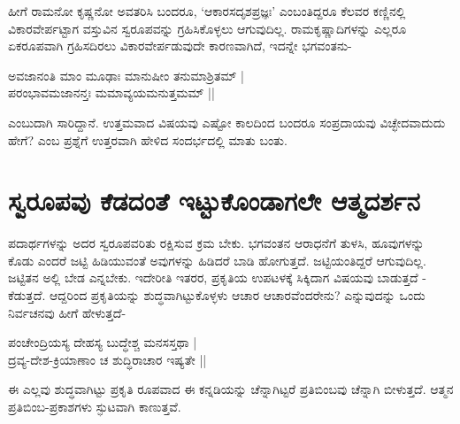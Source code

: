 ಹೀಗೆ ರಾಮನೋ ಕೃಷ್ಣನೋ ಅವತರಿಸಿ ಬಂದರೂ, `ಆಕಾರಸದೃಶಪ್ರಜ್ಞಃ' ಎಂಬಂತಿದ್ದರೂ ಕೆಲವರ ಕಣ್ಣಿನಲ್ಲಿ ವಿಕಾರವೇರ್ಪಟ್ಟಾಗ ವಸ್ತುವಿನ ಸ್ವರೂಪವನ್ನು ಗ್ರಹಿಸಿಕೊಳ್ಳಲು ಆಗುವುದಿಲ್ಲ. ರಾಮಕೃಷ್ಣಾದಿಗಳನ್ನು ಎಲ್ಲರೂ ಏಕರೂಪವಾಗಿ ಗ್ರಹಿಸದಿರಲು ವಿಕಾರವೇರ್ಪಡುವುದೇ ಕಾರಣವಾಗಿದೆ, ಇದನ್ನೇ ಭಗವಂತನು-

\begin{shloka}
ಅವಜಾನಂತಿ ಮಾಂ ಮೂಢಾಃ ಮಾನುಷೀಂ ತನುಮಾಶ್ರಿತಮ್ |\\
ಪರಂಭಾವಮಜಾನನ್ತಃ ಮಮಾವ್ಯಯಮನುತ್ತಮಮ್ ||
\end{shloka}

ಎಂಬುದಾಗಿ ಸಾರಿದ್ದಾನೆ. ಉತ್ತಮವಾದ ವಿಷಯವು ಎಷ್ಟೋ ಕಾಲದಿಂದ ಬಂದರೂ ಸಂಪ್ರದಾಯವು ವಿಚ್ಛೇದವಾದುದು ಹೇಗೆ? ಎಂಬ ಪ್ರಶ್ನೆಗೆ ಉತ್ತರವಾಗಿ ಹೇಳಿದ ಸಂದರ್ಭದಲ್ಲಿ ಮಾತು ಬಂತು.

\section*{ಸ್ವರೂಪವು ಕೆಡದಂತೆ ಇಟ್ಟುಕೊಂಡಾಗಲೇ ಆತ್ಮದರ್ಶನ}

ಪದಾರ್ಥಗಳನ್ನು ಅದರ ಸ್ವರೂಪವರಿತು ರಕ್ಷಿಸುವ ಕ್ರಮ ಬೇಕು. ಭಗವಂತನ ಆರಾಧನೆಗೆ ತುಳಸಿ, ಹೂವುಗಳನ್ನು ಕೊಡು ಎಂದರೆ ಜಟ್ಟಿ ಹಿಡಿಯುವಂತೆ ಅವುಗಳನ್ನು ಹಿಡಿದರೆ ಬಾಡಿ ಹೋಗುತ್ತದೆ. ಜಟ್ಟಿಯಂತಿದ್ದರೆ ಆಗುವುದಿಲ್ಲ. ಜಟ್ಟಿತನ ಅಲ್ಲಿ ಬೇಡ ಎನ್ನಬೇಕು. ಇದೇರೀತಿ ಇತರರ, ಪ್ರಕೃತಿಯ ಉಪಟಳಕ್ಕೆ ಸಿಕ್ಕಿದಾಗ ವಿಷಯವು ಬಾಡುತ್ತದೆ - ಕೆಡುತ್ತದೆ. ಆದ್ದರಿಂದ ಪ್ರಕೃತಿಯನ್ನು ಶುದ್ಧವಾಗಿಟ್ಟುಕೊಳ್ಳಳು ಆಚಾರ ಆಚಾರವೆಂದರೇನು? ಎನ್ನುವುದನ್ನು ಒಂದು ನಿರ್ವಚನವು ಹೀಗೆ ಹೇಳುತ್ತದೆ-

\begin{shloka}
ಪಂಚೇಂದ್ರಿಯಸ್ಯ ದೇಹಸ್ಯ ಬುದ್ಧೇಶ್ಚ ಮನಸಸ್ತಥಾ |\\
ದ್ರವ್ಯ-ದೇಶ-ಕ್ರಿಯಾಣಾಂ ಚ ಶುದ್ಧಿರಾಚಾರ ಇಷ್ಯತೇ ||
\end{shloka}

ಈ ಎಲ್ಲವು ಶುದ್ಧವಾಗಿಟ್ಟು ಪ್ರಕೃತಿ ರೂಪವಾದ ಈ ಕನ್ನಡಿಯನ್ನು ಚೆನ್ನಾಗಿಟ್ಟರೆ ಪ್ರತಿಬಿಂಬವು ಚೆನ್ನಾಗಿ ಬೀಳುತ್ತದೆ. ಆತ್ಮನ ಪ್ರತಿಬಿಂಬ-ಪ್ರಕಾಶಗಳು ಸ್ಫುಟವಾಗಿ ಕಾಣುತ್ತವೆ.

